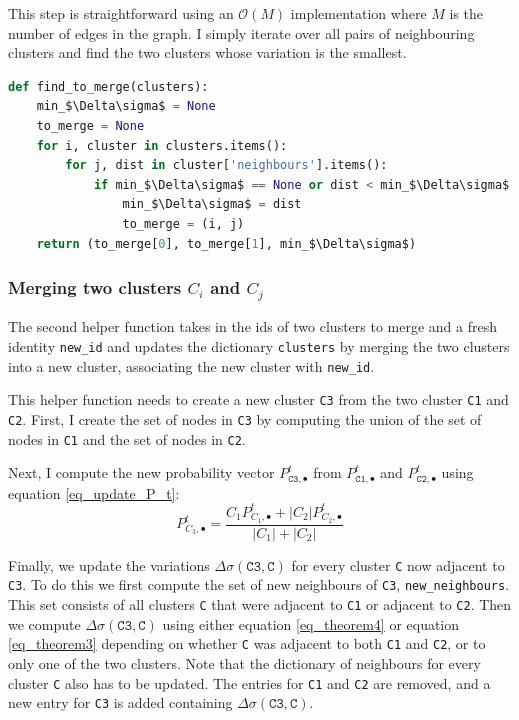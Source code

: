 \documentclass[12pt]{article}
\theoremstyle{definition}
\begin{document}
This step is straightforward using an $\mathcal{O}(M)$ implementation where $M$ is the number of edges in the graph. I simply iterate over all pairs of neighbouring clusters and find the two clusters whose variation is the smallest. 

\begin{lstlisting}[language=Python, mathescape]
def find_to_merge(clusters):
    min_$\Delta\sigma$ = None
    to_merge = None
    for i, cluster in clusters.items():
        for j, dist in cluster['neighbours'].items():
            if min_$\Delta\sigma$ == None or dist < min_$\Delta\sigma$:
                min_$\Delta\sigma$ = dist
                to_merge = (i, j)
    return (to_merge[0], to_merge[1], min_$\Delta\sigma$)
\end{lstlisting}


\subsubsection{Merging two clusters $C_i$ and $C_j$}
The second helper function takes in the ids of two clusters to merge and a fresh identity \texttt{new\_id} and updates the dictionary \texttt{clusters} by merging the two clusters into a new cluster, associating the new cluster with \texttt{new\_id}.

This helper function needs to create a new cluster \texttt{C3} from the two cluster \texttt{C1} and \texttt{C2}. First, I create the set of nodes in \texttt{C3} by computing the union of the set of nodes in \texttt{C1} and the set of nodes in \texttt{C2}.

Next, I compute the new probability vector $P_{\texttt{C3}, \bullet}^t$ from $P_{\texttt{C1}, \bullet}^t$ and $P_{\texttt{C2}, \bullet}^t$ using equation \ref{eq_update_P_t}:
\[P_{C_3,\bullet}^t = \frac{C_1 P_{C_1,\bullet}^t + |C_2| P_{C_2,\bullet}^t}{|C_1| + |C_2|}\]

Finally, we update the variations $\Delta\sigma(\texttt{C3}, \texttt{C})$ for every cluster \texttt{C} now adjacent to \texttt{C3}. To do this we first compute the set of new neighbours of \texttt{C3}, \texttt{new\_neighbours}. This set consists of all clusters \texttt{C} that were adjacent to \texttt{C1} or adjacent to \texttt{C2}. Then we compute $\Delta\sigma(\texttt{C3}, \texttt{C})$ using either equation \ref{eq_theorem4} or equation \ref{eq_theorem3} depending on whether \texttt{C} was adjacent to both \texttt{C1} and \texttt{C2}, or to only one of the two clusters. Note that the dictionary of neighbours for every cluster \texttt{C} also has to be updated. The entries for \texttt{C1} and \texttt{C2} are removed, and a new entry for \texttt{C3} is added containing $\Delta\sigma(\texttt{C3}, \texttt{C})$. 
\end{document}
